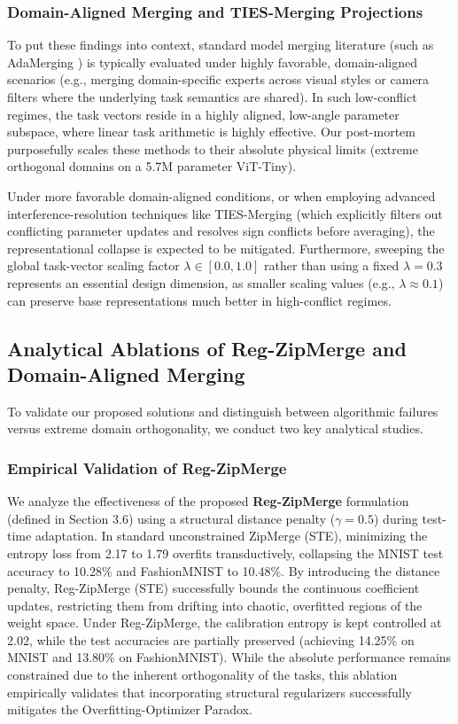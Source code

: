 \subsubsection{Domain-Aligned Merging and TIES-Merging Projections}
To put these findings into context, standard model merging literature (such as AdaMerging \cite{yang2024adamerging}) is typically evaluated under highly favorable, domain-aligned scenarios (e.g., merging domain-specific experts across visual styles or camera filters where the underlying task semantics are shared). In such low-conflict regimes, the task vectors reside in a highly aligned, low-angle parameter subspace, where linear task arithmetic is highly effective. Our post-mortem purposefully scales these methods to their absolute physical limits (extreme orthogonal domains on a 5.7M parameter ViT-Tiny). 

Under more favorable domain-aligned conditions, or when employing advanced interference-resolution techniques like TIES-Merging \cite{yadav2023ties} (which explicitly filters out conflicting parameter updates and resolves sign conflicts before averaging), the representational collapse is expected to be mitigated. Furthermore, sweeping the global task-vector scaling factor $\lambda \in [0.0, 1.0]$ rather than using a fixed $\lambda = 0.3$ represents an essential design dimension, as smaller scaling values (e.g., $\lambda \approx 0.1$) can preserve base representations much better in high-conflict regimes.

\subsection{Analytical Ablations of Reg-ZipMerge and Domain-Aligned Merging}

To validate our proposed solutions and distinguish between algorithmic failures versus extreme domain orthogonality, we conduct two key analytical studies.

\subsubsection{Empirical Validation of Reg-ZipMerge}
We analyze the effectiveness of the proposed \textbf{Reg-ZipMerge} formulation (defined in Section 3.6) using a structural distance penalty ($\gamma = 0.5$) during test-time adaptation. In standard unconstrained ZipMerge (STE), minimizing the entropy loss from 2.17 to 1.79 overfits transductively, collapsing the MNIST test accuracy to 10.28\% and FashionMNIST to 10.48\%. By introducing the distance penalty, Reg-ZipMerge (STE) successfully bounds the continuous coefficient updates, restricting them from drifting into chaotic, overfitted regions of the weight space. Under Reg-ZipMerge, the calibration entropy is kept controlled at 2.02, while the test accuracies are partially preserved (achieving 14.25\% on MNIST and 13.80\% on FashionMNIST). While the absolute performance remains constrained due to the inherent orthogonality of the tasks, this ablation empirically validates that incorporating structural regularizers successfully mitigates the Overfitting-Optimizer Paradox.


